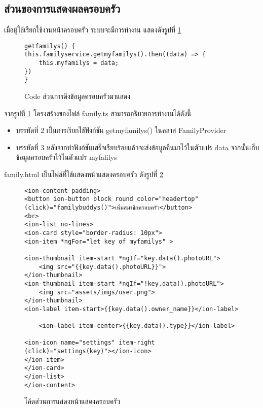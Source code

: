 
\subsection{ส่วนของการแสดงผลครอบครัว}
เมื่อผู้ใช้เรียกใช้งานหน้าครอบครัว ระบบจะมีการทำงาน แสดงดังรูปที่ \ref{Fig:4-family}

\begin{figure}[H]
{\lstset{language=Pascal}
\begin{lstlisting}
getfamilys() {
this.familyservice.getmyfamilys().then((data) => {
	this.myfamilys = data;
})
}
\end{lstlisting}}
\caption{Code ส่วนการดึงข้อมูลครอบครัวมาแสดง}
\label{Fig:4-family}
\end{figure}

จากรูปที่ \ref{Fig:4-family} โครงสร้างของไฟล์ family.ts สามารถอธิบายการทำงานได้ดังนี้
\begin{itemize}[label={--}]
\item บรรทัดที่ 2 เป็นการเรียกใช้ฟังก์ชัน getmyfamilys() ในคลาส FamilyProvider
\item บรรทัดที่ 3 หลังจากทำฟังก์ชันเสร็จเรียบร้อยแล้วจะส่งข้อมูลคืนมาไว้ในตัวแปร data จากนั้นเก็บข้อมูลครอบครัวไว้ในตัวแปร myfalilys
\end{itemize}
\newpage

family.html เป็นไฟล์ที่ใช้แสดงหน้าแสดงครอบครัว ดังรูปที่ \ref{Fig:4-showfamily}
\begin{figure}[H]
{\lstset{language=Pascal}
\begin{lstlisting}
<ion-content padding>
<button ion-button block round color="headertop" (click)="familybuddys()">เพิ่มสมาชิกครอบครัว</button>
<br>
<ion-list no-lines>
<ion-card style="border-radius: 10px">
<ion-item *ngFor="let key of myfamilys" >

<ion-thumbnail item-start *ngIf="key.data().photoURL">
	<img src="{{key.data().photoURL}}">
</ion-thumbnail>
<ion-thumbnail item-start *ngIf="!key.data().photoURL">
	<img src="assets/imgs/user.png">
</ion-thumbnail>
<ion-label item-start>{{key.data().owner_name}}</ion-label>

	<ion-label item-center>{{key.data().type}}</ion-label>

<ion-icon name="settings" item-right (click)="settings(key)"></ion-icon>
</ion-item>
</ion-card>
</ion-list>
</ion-content>
\end{lstlisting}}
\caption{โค้ดส่วนการแสดงหน้าแสดงครอบครัว}
\label{Fig:4-showfamily}
\end{figure}
\newpage

